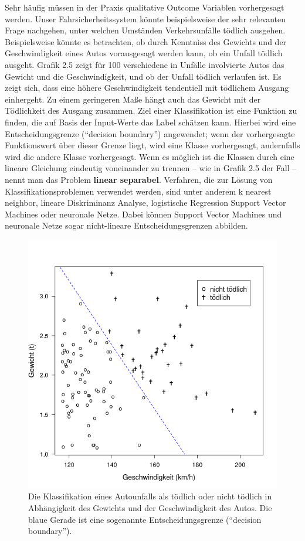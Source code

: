 Sehr häufig müssen in der Praxis qualitative Outcome Variablen vorhergesagt
werden. Unser Fahrsicherheitssystem könnte beispielsweise der sehr relevanten Frage
nachgehen, unter welchen Umständen Verkehrsunfälle tödlich ausgehen. Beispielsweise
könnte es betrachten, ob durch Kenntniss des Gewichts und der Geschwindigkeit eines
Autos vorausgesagt werden kann, ob ein Unfall tödlich ausgeht. Grafik 2.5 zeigt für
100 verschiedene in Unfälle involvierte Autos das Gewicht und die Geschwindigkeit,
und ob der Unfall tödlich verlaufen ist. Es zeigt sich, dass eine höhere
Geschwindigkeit tendentiell mit tödlichem Ausgang einhergeht. Zu einem geringeren
Maße hängt auch das Gewicht mit der Tödlichkeit des Ausgang zusammen. Ziel einer
Klassifikation ist eine Funktion zu finden, die auf Basis der Input-Werte das Label
schätzen kann. Hierbei wird eine Entscheidungsgrenze (``decision boundary'')
angewendet; wenn der vorhergesagte Funktionswert über dieser Grenze liegt, wird eine
Klasse vorhergesagt, andernfalls wird die andere Klasse vorhergesagt. Wenn es möglich
ist die Klassen durch eine lineare Gleichung eindeutig voneinander zu trennen -- wie
in Grafik 2.5 der Fall -- nennt man das Problem \textbf{linear separabel}.
Verfahren, die zur Lösung von Klassifikationsproblemen verwendet werden, sind unter
anderem k nearest neighbor, lineare Diskriminanz Analyse, logistische Regression
Support Vector Machines oder neuronale Netze. Dabei können Support Vector Machines
und neuronale Netze sogar nicht-lineare Entscheidungsgrenzen abbilden.

\begin{figure}[!ht]
  \caption{Die Klassifikation eines Autounfalls als tödlich oder nicht tödlich in
    Abhängigkeit des Gewichts und der Geschwindigkeit des Autos. Die blaue Gerade ist
    eine sogenannte Entscheidungsgrenze (``decision boundary'').} \centering
  \includegraphics[width=1\textwidth]{chapters/svm/death_data.png}
\end{figure}

